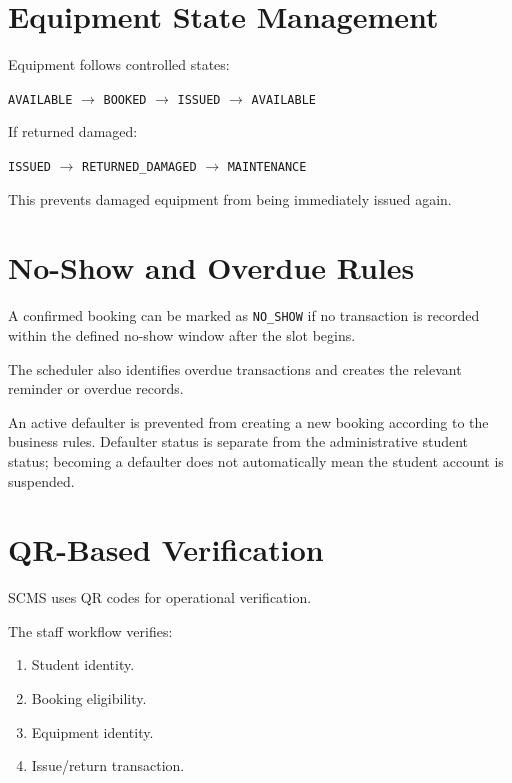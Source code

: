 \documentclass[12pt,a4paper,oneside]{report}
\begin{document}
\section{Equipment State Management}

Equipment follows controlled states:

\begin{center}
\texttt{AVAILABLE}
$\rightarrow$
\texttt{BOOKED}
$\rightarrow$
\texttt{ISSUED}
$\rightarrow$
\texttt{AVAILABLE}
\end{center}

If returned damaged:

\begin{center}
\texttt{ISSUED}
$\rightarrow$
\texttt{RETURNED\_DAMAGED}
$\rightarrow$
\texttt{MAINTENANCE}
\end{center}

This prevents damaged equipment from being immediately issued again.

\section{No-Show and Overdue Rules}

A confirmed booking can be marked as \texttt{NO\_SHOW} if no transaction is recorded within the defined no-show window after the slot begins.

The scheduler also identifies overdue transactions and creates the relevant reminder or overdue records.

An active defaulter is prevented from creating a new booking according to the business rules. Defaulter status is separate from the administrative student status; becoming a defaulter does not automatically mean the student account is suspended.

\section{QR-Based Verification}

SCMS uses QR codes for operational verification.

The staff workflow verifies:

\begin{enumerate}
    \item Student identity.
    \item Booking eligibility.
    \item Equipment identity.
    \item Issue/return transaction.
\end{enumerate}
\end{document}
